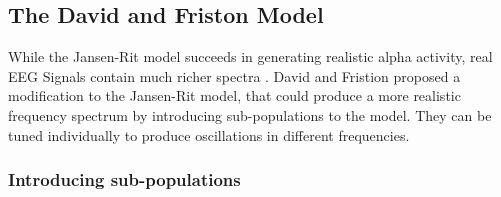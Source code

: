 
\pagebreak

\subsection{The David and Friston Model}\label{subsec:the-david-and-friston-model}

While the Jansen-Rit model succeeds in generating realistic alpha activity, real EEG Signals contain much richer spectra \parencite{steriade_impact_2001}. David and Fristion \cite{david_neural_2003} proposed a modification to the Jansen-Rit model, that could produce a more realistic frequency spectrum by introducing sub-populations to the model. They can be tuned individually to produce oscillations in different frequencies.

\subsubsection{Introducing sub-populations}

